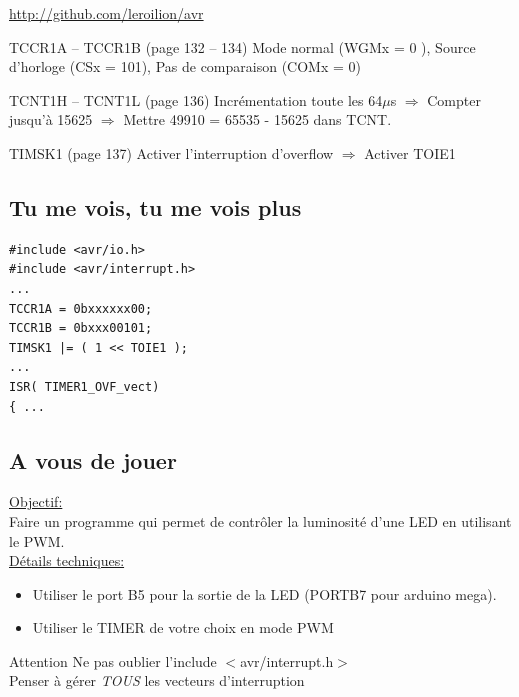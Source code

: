 \documentclass{beamer}
\def\Pause{2}
\begin{document}
\begin{frame}
  \hyperlink{http://github.com/leroilion/avr/tree/master/datasheet/Atmegaxx8.pdf}{http://github.com/leroilion/avr}
\ifthenelse{\equal{\Pause}{1}}
{
  \pause
}{}
  \begin{block}{TCCR1A -- TCCR1B (page 132 -- 134)}
    Mode normal (WGMx = 0 ), Source d'horloge (CSx = 101), Pas de comparaison (COMx = 0) 
  \end{block}
\ifthenelse{\equal{\Pause}{1}}
{
  \pause
}{}
  \begin{block}{TCNT1H -- TCNT1L (page 136) }
    Incr\'ementation toute les 64$\mu$s \pause $\Longrightarrow$ Compter jusqu'\`a 15625 \pause $\Longrightarrow$ Mettre 49910 = 65535 - 15625 dans TCNT.
  \end{block}
\ifthenelse{\equal{\Pause}{1}}
{
  \pause
}{}
  \begin{block}{TIMSK1 (page 137)}
    Activer l'interruption d'overflow \pause $\Longrightarrow$ Activer TOIE1
  \end{block}
\end{frame}

\subsection{Tu me vois, tu me vois plus}

\lstset{language=c++} 
\lstset{commentstyle=\textit} 
\begin{lstlisting}
#include <avr/io.h>
#include <avr/interrupt.h>
...
TCCR1A = 0bxxxxxx00;
TCCR1B = 0bxxx00101;
TIMSK1 |= ( 1 << TOIE1 );
...
ISR( TIMER1_OVF_vect)
{ ...
\end{lstlisting}

\subsection{A vous de jouer}

\begin{frame}
  \underline{Objectif:}\\
  Faire un programme qui permet de contr\^oler la luminosit\'e d'une LED en utilisant le PWM.\\
\ifthenelse{\equal{\Pause}{1}}
{
  \pause
}{}
  \underline{D\'etails techniques:}\\
  \begin{itemize}
\ifthenelse{\equal{\Pause}{1}}
{
  \pause
}{}
    \item Utiliser le port B5 pour la sortie de la LED (PORTB7 pour arduino mega).
\ifthenelse{\equal{\Pause}{1}}
{
  \pause
}{}
    \item Utiliser le TIMER de votre choix en mode PWM
  \end{itemize}

\ifthenelse{\equal{\Pause}{1}}
{
  \pause
}{}
  \begin{alertblock}{Attention}
    Ne pas oublier l'include $<$avr/interrupt.h$>$\\
    Penser \`a g\'erer \emph{TOUS} les vecteurs d'interruption
  \end{alertblock}
\end{frame}
\end{document}
